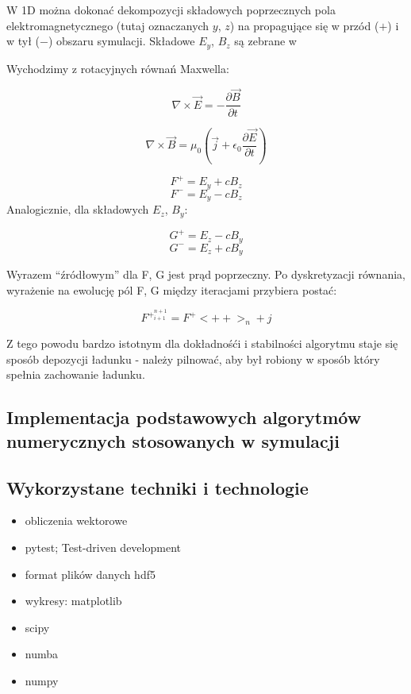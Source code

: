 W 1D można dokonać dekompozycji składowych poprzecznych pola elektromagnetycznego (tutaj oznaczanych $y$, $z$) na
propagujące się w przód ($+$) i w tył ($-$) obszaru symulacji. Składowe $E_y$, $B_z$ są zebrane w %

Wychodzimy z rotacyjnych równań Maxwella:

\begin{equation}
    \nabla \times \vec{E} = -\frac{\partial \vec{B}}{\partial t}
\end{equation}

\begin{equation}
    \nabla \times \vec{B} = \mu_0 (\vec{j} + \epsilon_0 \frac{\partial \vec{E}}{\partial t})
\end{equation}


\begin{equation}
    F^{+} = E_y + c B_z
\end{equation}
\begin{equation}
    F^{-} = E_y - c B_z
\end{equation}
Analogicznie, dla składowych $E_z$, $B_y$:

\begin{equation}
    G^{+} = E_z - c B_y
\end{equation}
\begin{equation}
    G^{-} = E_z + c B_y
\end{equation}

Wyrazem ``źródłowym'' dla F, G jest prąd poprzeczny. Po dyskretyzacji równania, wyrażenie na ewolucję pól F, G między
iteracjami przybiera postać:

\begin{equation}
    F^{+}^{n+1}_{i+1} = F^{+}<++>_{n} + j%
\end{equation}

Z tego powodu bardzo istotnym dla dokładnośći i stabilności algorytmu staje się sposób depozycji ładunku - należy pilnować,
aby był robiony w sposób który spełnia zachowanie ładunku.

\subsection{Implementacja podstawowych algorytmów numerycznych stosowanych w symulacji}

\subsection{Wykorzystane techniki i technologie}
\begin{itemize}
    \item obliczenia wektorowe
    \item pytest; Test-driven development
    \item format plików danych hdf5
    \item wykresy: matplotlib
    \item scipy
    \item numba
    \item numpy
\end{itemize}


